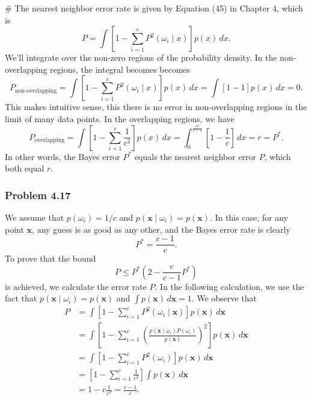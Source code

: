 \documentclass[12pt, a4paper]{article}
\newcommand{\vect}[1]{\bm{#1}}
\begin{document}
\begin{easylist}[enumerate]
# The nearest neighbor error rate is given by Equation (45) in Chapter 4, which is 
\begin{equation*}
	P = \int \left[1 - \sum_{i=1}^{c} P^2\left( \omega_i \mid x \right) \right]
	p(x) \, dx.
\end{equation*}
We'll integrate over the non-zero regions of the probability density.
In the non-overlapping regions, the integral becomes becomes
\begin{equation*}
	P_\text{non-overlapping} = \int \left[1 - \sum_{i=1}^{c} P^2\left( \omega_i \mid x \right) \right] p(x) \, dx
	= \int \left[1 - 1 \right]
	p(x) \, dx = 0.
\end{equation*}
This makes intuitive sense, this there is no error in non-overlapping regions in the limit of many data points.
In the overlapping regions, we have
\begin{equation*}
P_\text{overlapping}
= \int \left[1 - \sum_{i=1}^{c} \frac{1}{c^2} \right] p(x) \, dx
= \int_{0}^{\frac{cr}{c-1}} \left[1 - \frac{1}{c} \right] \, dx = r = P^*.
\end{equation*}
In other words, the Bayes error $P^*$ equals the nearest neighbor error $P$, which both equal $r$.

\end{easylist}


\subsubsection*{Problem 4.17}
We assume that $p(\omega_i) = 1/ c$ and $p(\vect{x} \mid \omega_i) = p(\vect{x})$.
In this case, for any point $\vect{x}$, any guess is as good as any other, and the Bayes error rate is clearly
\begin{equation*}
	P^* = \frac{c-1}{c}.
\end{equation*}
To prove that the bound
\begin{equation}
\label{eqn:ch4_problem17}
	P \leq P^* \left( 2 - \frac{c}{c - 1}P^* \right)
\end{equation}
is achieved, we calculate the error rate $P$.
In the following calculation, we use the fact that $p(\vect{x} \mid \omega_i) = p(\vect{x})$ and $\int p( \vect{x}) \, d\vect{x} = 1$.
We observe that
\begin{align*}
	P &= \int \left[ 1 - \sum_{i=1}^{c} P^2 \left( \omega_i \mid \vect{x} \right) \right] p( \vect{x}) \, d\vect{x} \\
	&= \int \left[ 1 - \sum_{i=1}^{c}  \left( \frac{p(\vect{x} \mid \omega_i) P( \omega_i) }{p(\vect{x})} \right)^2 \right] p( \vect{x}) \, d\vect{x} \\
	&= \int \left[ 1 - \sum_{i=1}^{c} P^2( \omega_i) \right] p( \vect{x}) \, d\vect{x} \\
	&= \left[ 1 - \sum_{i=1}^{c} \frac{1}{c^2} \right]  \int  p( \vect{x}) \, d\vect{x} \\
	&= 1 - c \frac{1}{c^2} = \frac{c-1}{c}.
\end{align*}
\end{document}

